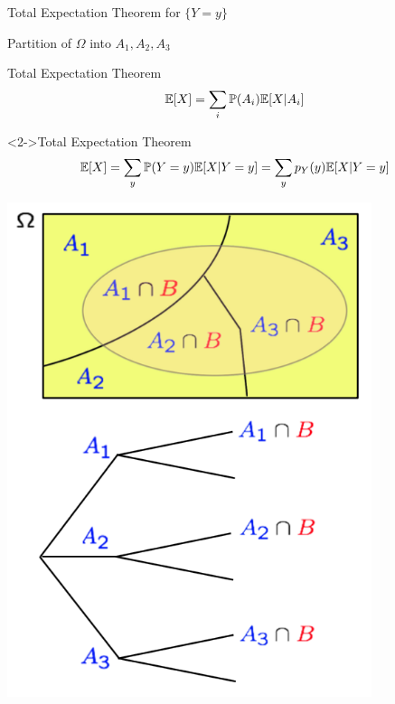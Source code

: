 \documentclass[fleqn,aspectratio=169]{beamer}
\begin{document}
\begin{frame}{Total Expectation Theorem for $\{Y=y \}$}

{
\plitemsep 0.1in
\bci [$\circ$]

\item Partition of $\Omega$ into $A_1,A_2,A_3$


\bigskip
\medskip

\begin{block}{Total Expectation Theorem}
$$
\mathbb{E}[ X ] = \sum_{i} \mathbb{P}( A_i ) \mathbb{E}[ X | A_i ]
$$
\end{block}

\begin{block}<2->{Total Expectation Theorem}
$$
\mathbb{E}[ X ] = \sum_{y} \mathbb{P}( Y=y ) \mathbb{E}[ X | Y= y ] = \sum_{y} p_Y(y) \mathbb{E}[ X | Y=y ] 
$$
\end{block}


\eci 
}
{
\centering
\includegraphics[width=0.8\textwidth]{L2_total_ex.png}
}

\end{frame}
\end{document}
